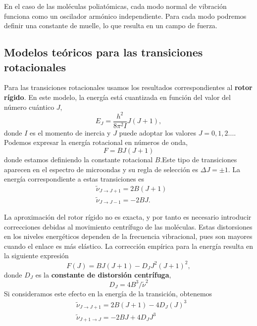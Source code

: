 \documentclass{tufte-book}
\begin{document}
En el caso de las moléculas poliatómicas, cada modo normal de vibración
funciona como un oscilador armónico independiente. Para cada modo 
podremos definir una constante de muelle, lo que resulta en un
campo de fuerza.

\subsection{Modelos teóricos para las transiciones rotacionales}
Para las transiciones rotacionales usamos los resultados  
correspondientes al \textbf{rotor rígido}. En este modelo, 
la energía está cuantizada en función del valor del número cuántico
$J$,
\begin{equation}
    E_J=\frac{h^2}{8\pi^2I}J(J+1),
\end{equation}
donde $I$ es el momento de inercia y $J$ puede adoptar los valores 
$J=0,1,2...$. Podemos expresar la energía rotacional en números de onda,
\begin{equation}
    F=BJ(J+1)
    \label{eq:F}
\end{equation}
donde estamos definiendo la constante rotacional $B$.Este
tipo de transiciones aparecen en el espectro de microondas y su
regla de selección es $\Delta J=\pm 1$. La energía correspondiente 
a estas transiciones es
\begin{align}
    &\tilde{\nu}_{J\rightarrow J+1} = 2B(J+1)\\
    &\tilde{\nu}_{J\rightarrow J-1} = -2BJ.
\end{align}

La aproximación del rotor rígido no es exacta, y por tanto es necesario
introducir correcciones debidas al movimiento centrífugo de las moléculas.
Estas distorsiones en los niveles energéticos dependen de la frecuencia
vibracional, pues son mayores cuando el enlace es más elástico. La corrección
empírica para la energía resulta en la siguiente expresión
\begin{equation}
    F(J)=BJ(J+1) - D_JJ^2(J+1)^2,
\end{equation}
donde $D_J$ es la \textbf{constante de distorsión centrífuga}, 
\begin{equation}
    D_J=4B^3/\tilde{\nu}^2\label{eq:centrif}    
\end{equation}
Si consideramos este efecto en la energía de la transición, obtenemos
\begin{align}
    &\tilde{\nu}_{J\rightarrow J+1} = 2B(J+1) - 4D_J(J)^3\\
    &\tilde{\nu}_{J+1\rightarrow J} = -2BJ + 4D_JJ^3
\end{align}
\end{document}
